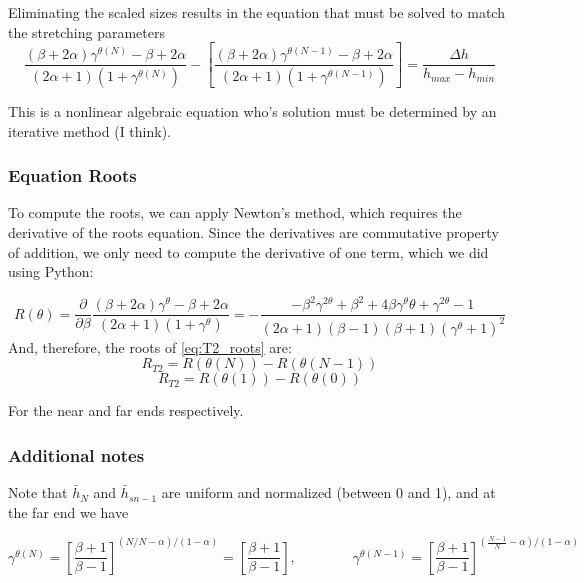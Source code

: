 \documentclass[11pt]{article}
\newcommand{\g}{\gamma}
\begin{document}
Eliminating the scaled sizes results in the equation that must be solved to match the stretching parameters
\begin{equation} \label{eq:T2_roots}
	\boxed{
	\frac{(\beta+2\alpha)\g^{\theta(N)} - \beta + 2\alpha}{(2\alpha+1) \left(1+\g^{\theta(N)} \right)}
	-
	\left[
	\frac{(\beta+2\alpha)\g^{\theta(N-1)} - \beta + 2\alpha}{(2\alpha+1) \left(1+\g^{\theta(N-1)} \right)}
	\right]
	=
	\frac{\Delta h}{h_{max}-h_{min}}
	}
\end{equation}

This is a nonlinear algebraic equation who's solution must be determined by an iterative method (I think).

\subsubsection{Equation Roots}
To compute the roots, we can apply Newton's method, which requires the derivative of the roots equation. Since the derivatives are commutative property of addition, we only need to compute the derivative of one term, which we did using Python:

\begin{equation} \label{eq:T2_prime}
	R(\theta) = \frac{\partial}{\partial \beta}
	\frac{(\beta+2\alpha)\g^{\theta} - \beta + 2\alpha}{(2\alpha+1) \left(1+\g^{\theta} \right)}
	= - \frac{- \beta^{2} \g^{2 \theta} + \beta^{2} + 4 \beta \g^{\theta} \theta + \g^{2 \theta} - 1}{\left(2 \alpha + 1\right) \left(\beta - 1\right) \left(\beta + 1\right) \left(\g^{\theta} + 1\right)^{2}}
\end{equation}
And, therefore, the roots of \ref{eq:T2_roots} are:
\begin{equation}
	R_{T2} = R(\theta(N)) - R(\theta(N-1))
\end{equation}
\begin{equation}
	R_{T2} = R(\theta(1)) - R(\theta(0))
\end{equation}

For the near and far ends respectively.

\subsubsection{Additional notes}
Note that $\bar{h}_{N}$ and $\bar{h}_{sn-1}$ are uniform and normalized (between 0 and 1), and at the far end we have

\begin{equation}
	\g^{\theta(N)} = \left[
	\frac{\beta+1}{\beta-1}
	\right]^{(N/N-\alpha)/(1-\alpha)} =
	\left[
	\frac{\beta+1}{\beta-1}
	\right]
	, \qquad \qquad
	\g^{\theta(N-1)} = \left[
	\frac{\beta+1}{\beta-1}
	\right]^{(\frac{N-1}{N}-\alpha)/(1-\alpha)}
\end{equation}
\end{document}
